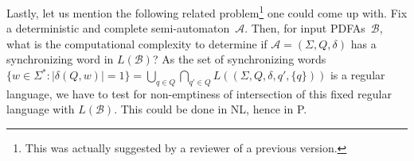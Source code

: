 \documentclass[runningheads,envcountsame]{llncs}
\theoremstyle{plain}
\theoremstyle{definition}
\newcommand{\NL}{\textsf{NL}}
\newcommand{\PTIME}{\textsf{P}}
\begin{document}
 Lastly, let us mention the following related problem\footnote{This was actually suggested
 by a reviewer of a previous version.} one could come up with.
 Fix a deterministic and complete semi-automaton~$\mathcal A$.
 Then, for input PDFAs~$\mathcal B$, what is the computational complexity to determine
 if $\mathcal A = (\Sigma, Q, \delta)$ has a synchronizing word in $L(\mathcal B)$?
 As the set of synchronizing words 
 $ \{ w \in \Sigma^* : |\delta(Q, w)| = 1 \} = \bigcup_{q \in Q} \bigcap_{q' \in Q} L((\Sigma, Q, \delta, q', \{q\})) $
 is a regular language, we have to test
 for non-emptiness of intersection of this fixed regular language 
 with $L(\mathcal B)$. This could be done in \NL, hence in \PTIME.
 

\smallskip {}






 
\end{document}
